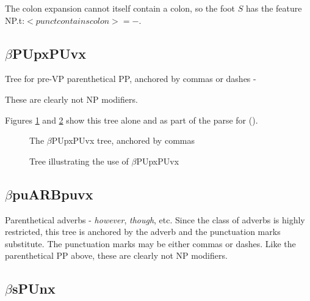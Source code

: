 The colon expansion cannot itself contain a colon, so the foot $S$ has the
feature NP.t:$<punct contains colon> = -$. 

\subsection{$\beta$PUpxPUvx}

Tree for pre-VP parenthetical PP, anchored by commas or dashes - 


\noindent
These are clearly not NP modifiers. 

Figures \ref{betaPUpxPUvx} and \ref{PUpxPUvx-anger} show this tree
alone and as part of the parse for ().

\begin{figure}[hbt]
\centering
\hspace{0.0in}
\caption{The $\beta$PUpxPUvx tree, anchored by commas}
\label{betaPUpxPUvx}
\end{figure}

\begin{figure}[hbt]
\centering
\hspace{0.0in}
\caption{Tree illustrating the use of $\beta$PUpxPUvx}
\label{PUpxPUvx-anger}
\end{figure}

\subsection{$\beta$puARBpuvx}
\label{par-adverb}

Parenthetical adverbs - {\it however}, {\it though}, etc. Since the
class of adverbs is highly restricted, this tree is anchored by the
adverb and the punctuation marks substitute.  The punctuation marks
may be either commas or dashes.  Like the parenthetical PP above,
these are clearly not NP modifiers.


\subsection{$\beta$sPUnx}

